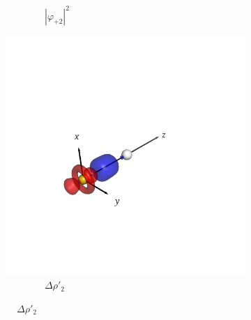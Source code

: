 \documentclass[journal=inoraj,manuscript=article]{achemso}
\begin{document}
\begin{figure}[!h]
\begin{subfigure}[t]{0.32\textwidth}
        \caption*{\ \ \ \ \ \ \ \ $|\varphi_{+2}|^2$}
    \end{subfigure}
    \hfill
    \begin{subfigure}[t]{0.32\textwidth}
        \centering
        \includegraphics[width=\linewidth]{./AuOg+/pair3.png} 
        \caption*{\ \ \ \ \ \ \ \ $\Delta \rho'_2$} 
    \end{subfigure}


\end{figure}
\end{document}
